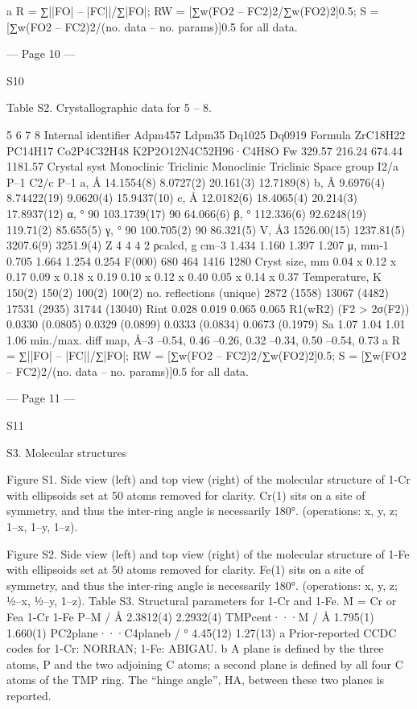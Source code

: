 a R = ∑||FO| – |FC||/∑|FO|; RW = [∑w(FO2 – FC2)2/∑w(FO2)2]0.5; S = [∑w(FO2 – FC2)2/(no. data – no. params)]0.5 for all data. 
 
 


--- Page 10 ---
 
 
S10 
 
 
Table S2. Crystallographic data for 5 – 8. 
 
5 
6 
7 
8 
Internal identifier 
Adpm457 
Ldpm35 
Dq1025 
Dq0919 
Formula 
ZrC18H22 
PC14H17 
Co2P4C32H48 
K2P2O12N4C52H96·C4H8O 
Fw 
329.57 
216.24 
674.44 
1181.57 
Crystal syst 
Monoclinic 
Triclinic 
Monoclinic 
Triclinic 
Space group 
I2/a 
P–1 
C2/c 
P–1 
a, Å 
14.1554(8)  
8.0727(2) 
20.161(3) 
12.7189(8) 
b, Å 
9.6976(4) 
8.74422(19) 
9.0620(4) 
15.9437(10) 
c, Å 
12.0182(6) 
18.4065(4) 
20.214(3) 
17.8937(12) 
α, ° 
90 
103.1739(17) 
90 
64.066(6) 
β, ° 
112.336(6) 
92.6248(19) 
119.71(2) 
85.655(5) 
γ, ° 
90 
100.705(2) 
90 
86.321(5) 
V, Å3 
1526.00(15) 
1237.81(5) 
3207.6(9) 
3251.9(4) 
Z 
4 
4 
4 
2 
ρcalcd, g cm–3 
1.434 
1.160 
1.397 
1.207 
μ, mm-1 
0.705 
1.664 
1.254 
0.254 
F(000) 
680 
464 
1416 
1280 
Cryst size, mm 
0.04 x 0.12 x 0.17 
0.09 x 0.18 x 0.19 
0.10 x 0.12 x 0.40 
0.05 x 0.14 x 0.37 
Temperature, K 
150(2) 
150(2) 
100(2) 
100(2) 
no. reflections (unique) 
2872 (1558) 
13067 (4482) 
17531 (2935) 
31744 (13040) 
Rint 
0.028 
0.019 
0.065 
0.065 
R1(wR2) (F2 > 2σ(F2)) 
0.0330 (0.0805) 
0.0329 (0.0899) 
0.0333 (0.0834) 
0.0673 (0.1979) 
Sa 
1.07 
1.04 
1.01 
1.06 
min./max. diff map, Å–3 
–0.54, 0.46 
–0.26, 0.32 
–0.34, 0.50 
–0.54, 0.73 
a R = ∑||FO| – |FC||/∑|FO|; RW = [∑w(FO2 – FC2)2/∑w(FO2)2]0.5; S = [∑w(FO2 – FC2)2/(no. data – no. params)]0.5 for all data. 
 
 


--- Page 11 ---
 
 
S11 
 
 
S3. Molecular structures 
 
Figure S1. Side view (left) and top view (right) of the molecular structure of 1-Cr with ellipsoids set at 50%
atoms removed for clarity. Cr(1) sits on a site of symmetry, and thus the inter-ring angle is necessarily 180°. (operations: x, y, 
z; 1–x, 1–y, 1–z). 
 
 
Figure S2. Side view (left) and top view (right) of the molecular structure of 1-Fe with ellipsoids set at 50%
atoms removed for clarity. Fe(1) sits on a site of symmetry, and thus the inter-ring angle is necessarily 180°. (operations: x, y, 
z; ½–x, ½–y, 1–z). 
Table S3. Structural parameters for 1-Cr and 1-Fe. 
M = Cr or Fea 
1-Cr 
1-Fe 
P–M / Å 
2.3812(4) 
2.2932(4) 
TMPcent···M / Å 
1.795(1) 
1.660(1) 
PC2plane···C4planeb / ° 
4.45(12) 
1.27(13) 
a Prior-reported CCDC codes for 1-Cr: NORRAN; 1-Fe: ABIGAU. 
b A plane is defined by the three atoms, P and the two adjoining C atoms; a second plane is defined by all four C atoms of the 
TMP ring. The “hinge angle”, HA, between these two planes is reported. 
 
